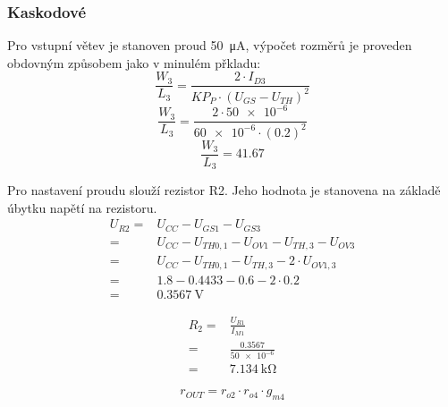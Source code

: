 \subsubsection{Kaskodové}
Pro vstupní větev je stanoven proud \qty{50}{\micro\ampere}, výpočet rozměrů je proveden obdovným způsobem jako v minulém přkladu:
\[
    \frac{W_3}{L_3}=\frac{2\cdot I_{D3}}{KP_{P}\cdot (U_{GS} -U_{TH})^2 } 
\]
\[
    \frac{W_3}{L_3}=\frac{2\cdot \num{50e-6}}{\num{60e-6} \cdot (\num{0.2})^2 } 
\]
\[
    \frac{W_3}{L_3}=\num{41,67}
\]

Pro nastavení proudu slouží rezistor R2. Jeho hodnota je stanovena na základě úbytku napětí na rezistoru.
\begin{align*}
    U_{R 2}=&U_{C C}-U_{G S 1}-U_{G S 3} \\
           =&U_{C C}-U_{T H 0,1}- U_{O V 1}-U_{T H, 3}-U_{O V 3} \\
           =&U_{C C}-U_{T H 0,1}-U_{T H, 3}-2 \cdot U_{O V 1,3} \\
           =&\num{1.8}-\num{0.4433}-\num{0.6}-2 \cdot \num{0.2} \\
           =&\qty{0.3567}{\volt}
\end{align*}

\begin{align*}
    R_{2} =& \frac{U_{R1}}{I_{M1} } \\
          =& \frac{\num{0.3567}}{\num{50e-6}} \\
          =& \qty{7.134}{\kilo\ohm}
\end{align*}

\[
    r_{OUT} =r_{o2} \cdot r_{o4} \cdot g_{m4} 
\]